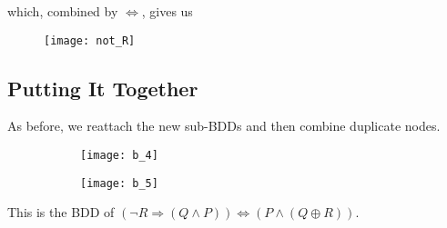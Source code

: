 \documentclass[11pt]{article}
\begin{document}
which, combined by $\iff$, gives us

\begin{figure}[H]
	\centering
	\texttt{[image: not\_R]}
\end{figure}

\pagebreak

\subsection{Putting It Together}

As before, we reattach the new sub-BDDs and then combine duplicate nodes.

\begin{figure}[H]
  \centering
  \begin{subfigure}{0.59\textwidth}
    \centering
    \texttt{[image: b\_4]}
  \end{subfigure}
  \begin{subfigure}{0.39\textwidth}
    \centering
    \texttt{[image: b\_5]}
  \end{subfigure}
\end{figure}

This is the BDD of $(\neg R \Rightarrow (Q \wedge P)) \iff (P \wedge (Q \oplus R))$.

\end{document}
